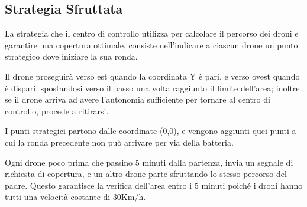 \documentclass{article}
\begin{document}
\subsection{Strategia Sfruttata}
\raggedright\par{\large{
		La strategia che il centro di controllo utilizza per calcolare il percorso dei droni e garantire una copertura ottimale, consiste nell'indicare a ciascun drone un punto strategico dove iniziare la sua ronda.
	}}
\vspace{10pt}
\raggedright\par{\large{
		Il drone proseguirà verso est quando la coordinata Y è pari, e verso ovest quando è dispari, spostandosi verso il basso una volta raggiunto il limite dell'area; inoltre se il drone arriva ad avere l'autonomia sufficiente per tornare al centro di controllo, procede a ritirarsi.
	}}
\vspace{10pt}
\raggedright\par{\large{
		I punti strategici partono dalle coordinate (0,0), e vengono aggiunti quei punti a cui la ronda precedente non può arrivare per via della batteria.
	}}
\vspace{10pt}
\raggedright\par{\large{
		Ogni drone poco prima che passino 5 minuti dalla partenza, invia un segnale di richiesta di copertura, e un altro drone parte sfruttando lo stesso percorso del padre. Questo garantisce la verifica dell'area entro i 5 minuti poiché i droni hanno tutti una velocità costante di 30Km/h.
	}}
\end{document}
